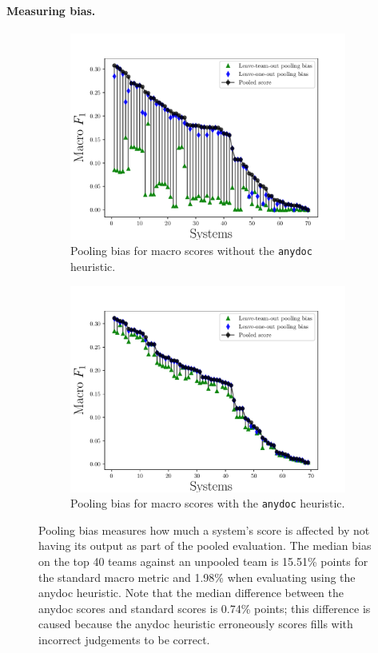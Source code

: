 \paragraph{Measuring bias.}
\begin{figure}[t]
  \begin{subfigure}{\columnwidth}
  \includegraphics[width=\columnwidth]{figures/pooling-bias}
  \caption{Pooling bias for macro \fone{} scores without the \texttt{anydoc} heuristic.}
  \end{subfigure}
  \begin{subfigure}{\columnwidth}
  \includegraphics[width=\columnwidth]{figures/pooling-bias-anydoc}
  \caption{Pooling bias for macro \fone{} scores with the \texttt{anydoc} heuristic.}
  \end{subfigure}
  \caption{\label{fig:pooling-bias} Pooling bias measures how much a system's score is affected by not having its output as part of the pooled evaluation.
  The median bias on the top 40 teams against an unpooled team is 15.51\% points for the standard macro \fone{} metric and 1.98\% when evaluating using the anydoc heuristic.
  Note that the median difference between the anydoc scores and standard scores is 0.74\% points; this difference is caused because the anydoc heuristic erroneously scores fills with incorrect judgements to be correct.}
\end{figure}

